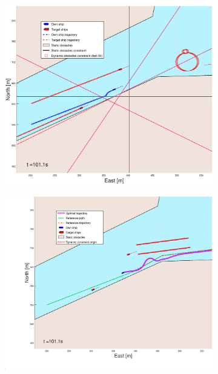 \begin{figure}[!ht] %
    \begin{subfigure}[b]{0.49\textwidth}
        \centering
        \includegraphics[width=\textwidth]{Images/Figures/Trheimfjord/_Simple_1fig1_time=101}
    \end{subfigure}
    \hfill
    \begin{subfigure}[b]{0.499\textwidth}
        \centering
        \includegraphics[width=\textwidth]{Images/Figures/Trheimfjord/_Simple_1fig999_time=101}

\end{subfigure}
\end{figure}
